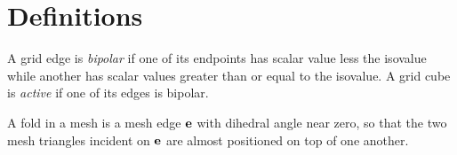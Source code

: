 
\section{Definitions}
\label{section:definitions}

A grid edge is {\em bipolar} if one of its endpoints has scalar value
less the isovalue while another has scalar values greater than
or equal to the isovalue.
A grid cube is {\em active} if one of its edges is bipolar.

A fold in a mesh is a mesh edge $\mathbf{e}$ with dihedral angle near zero,
so that the two mesh triangles incident on $\mathbf{e}$ are almost positioned
on top of one another.


